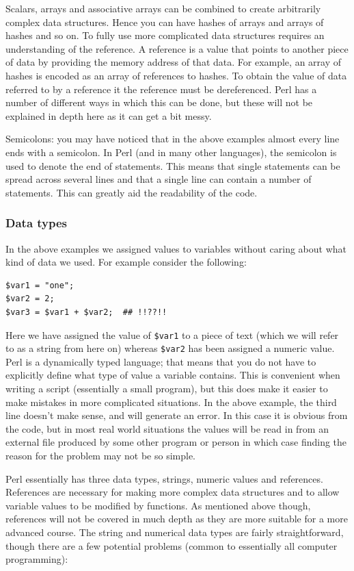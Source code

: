 \documentclass[11pt]{article}
\begin{document}
Scalars, arrays and associative arrays can be combined to create
arbitrarily complex data structures. Hence you can have hashes of arrays
and arrays of hashes and so on. To fully use more complicated data
structures requires an understanding of the reference. A reference is a
value that points to another piece of data by providing the memory
address of that data. For example, an array of hashes is encoded as an
array of references to hashes. To obtain the value of data referred to
by a reference it the reference must be dereferenced. Perl has
a number of different ways in which this can be done, but these will not
be explained in depth here as it can get a bit messy. 

Semicolons: you may have noticed that in the above examples almost every
line ends with a semicolon. In Perl (and in many other languages), the
semicolon is used to denote the end of statements. This means
that single statements can be spread across several lines and that a
single line can contain a number of statements. This can greatly aid the
readability of the code.
\subsubsection{Data types}
\label{sec-5-3}


In the above examples we assigned values to variables without caring
about what kind of data we used. For example consider the following:


\begin{verbatim}
$var1 = "one";
$var2 = 2;
$var3 = $var1 + $var2;  ## !!??!!
\end{verbatim}

Here we have assigned the value of \texttt{\$var1} to a piece of text (which we
will refer to as a string from here on) whereas \texttt{\$var2} has been
assigned a numeric value. Perl is a dynamically typed language; that
means that you do not have to explicitly define what type of value a
variable contains. This is convenient when writing a script (essentially
a small program), but this does make it easier to make mistakes in more
complicated situations. In the above example, the third line doesn't
make sense, and will generate an error. In this case it is obvious from
the code, but in most real world situations the values will be read in
from an external file produced by some other program or person in which
case finding the reason for the problem may not be so simple.

Perl essentially has three data types, strings, numeric values and
references. References are necessary for making more complex data
structures and to allow variable values to be modified by functions. As
mentioned above though, references will not be covered in much depth as
they are more suitable for a more advanced course. The string and
numerical data types are fairly straightforward, though there are a few
potential problems (common to essentially all computer programming):
\end{document}
